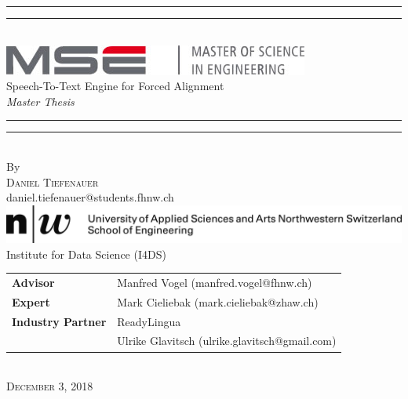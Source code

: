 \begin{titlepage}
\vspace*{13mm}
\begin{center}
	\rule[0.5ex]{\linewidth}{2pt}\vspace*{-\baselineskip}\vspace*{3.2pt}
	\rule[0.5ex]{\linewidth}{1pt}\\[\baselineskip]
	\includegraphics[scale=0.4]{./img/mse_logo.jpg}\\[4mm]
	{\huge Speech-To-Text Engine for Forced Alignment }\\[4mm]
	{\Large \textit{Master Thesis}}\\
	\rule[0.5ex]{\linewidth}{1pt}\vspace*{-\baselineskip}\vspace{3.2pt}
	\rule[0.5ex]{\linewidth}{2pt}\\
	\vspace{6.5mm}
	{\large By}\\
	\vspace{6.5mm}
	{\large\textsc{Daniel Tiefenauer}}\\
	daniel.tiefenauer@students.fhnw.ch\\
	\vspace{11mm}
	\includegraphics{./img/fhnw_logo.jpg} \\
	\vspace{6mm}
	{\large Institute for Data Science (I4DS)}\\
	\vspace{11mm}
	\begin{minipage}{10cm}
		\begin{tabular}{ll}
			\textbf{Advisor} & Manfred Vogel (manfred.vogel@fhnw.ch) \\
			\textbf{Expert} & Mark Cieliebak (mark.cieliebak@zhaw.ch) \\
			\textbf{Industry Partner} & ReadyLingua \\
 			& Ulrike Glavitsch (ulrike.glavitsch@gmail.com)
		\end{tabular}
	\end{minipage}\\
	\vspace{9mm}
	{\large\textsc{December 3, 2018}}
	\vspace{12mm}
\end{center}
\end{titlepage}